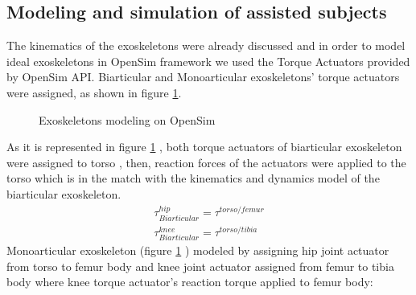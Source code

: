 \documentclass[10pt,letterpaper]{article}
\begin{document}
\subsection*{Modeling and simulation of assisted subjects}
The kinematics of the exoskeletons were already discussed and in order to model ideal exoskeletons in OpenSim framework we used the Torque Actuators provided by OpenSim API\cite{103}. Biarticular and Monoarticular exoskeletons' torque actuators were assigned, as shown in figure \ref{Fig_Exos_Model_Opensim}.
\begin{figure}[h!]
	\centering
	\hfil
	\caption{Exoskeletons modeling on OpenSim}
	\label{Fig_Exos_Model_Opensim}
\end{figure}
As it is represented in figure \ref{Fig_Exos_Model_Opensim} , both torque actuators of biarticular exoskeleton were assigned to torso , then, reaction forces of the actuators were applied to the torso which is in the match with the kinematics and dynamics model of the biarticular exoskeleton.
\begin{align}\label{Eqn_Biarticular_Torque_Act}
\tau^{hip}_{Biarticular} = \tau^{torso/femur}\\
\tau^{knee}_{Biarticular} = \tau^{torso/tibia}
\end{align}
Monoarticular exoskeleton (figure \ref{Fig_Exos_Model_Opensim} ) modeled by assigning hip joint actuator from torso to femur body and knee joint actuator assigned from femur to tibia body where knee torque actuator's reaction torque applied to femur body:
\end{document}
